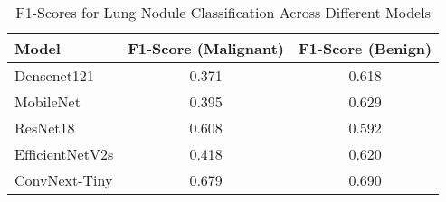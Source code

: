 \begin{table}[htbp]
    \centering
    \begin{tabular}{lcc}
        \toprule
        \textbf{Model} & \textbf{F1-Score (Malignant)} & \textbf{F1-Score (Benign)} \\
        \midrule
        Densenet121      & 0.371 & 0.618 \\
        MobileNet        & 0.395 & 0.629 \\
        ResNet18         & 0.608 & 0.592 \\
        EfficientNetV2s  & 0.418 & 0.620 \\
        \rowcolor{yellow!20}
        ConvNext-Tiny         & 0.679 & 0.690 \\
        \bottomrule
    \end{tabular}
    \caption{F1-Scores for Lung Nodule Classification Across Different Models}
    \label{tab:classification-performances}
\end{table}